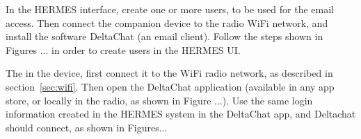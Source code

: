 \documentclass[11pt,a4paper]{article}
\begin{document}
In the HERMES interface, create one or more users, to be used for the email access. Then connect the companion
device to the radio WiFi network, and install the software DeltaChat (an email client). Follow the steps
shown in Figures ... in order to create users in the HERMES UI.


The in the device, first connect it to the WiFi radio network, as described in section~\ref{sec:wifi}. Then open
the DeltaChat application (available in any app store, or locally in the radio, as shown in Figure ...). Use the
same login information created in the HERMES system in the DeltaChat app, and Deltachat should connect, as shown in Figures...

\end{document}
